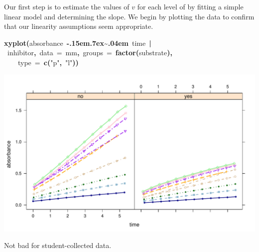 \documentclass{article}
\makeatletter
\newcommand{\hlfunctioncall}[1]{\textcolor[rgb]{0.501960784313725,0,0.329411764705882}{\textbf{#1}}}%
\newcommand{\hlstring}[1]{\textcolor[rgb]{0.6,0.6,1}{#1}}%
\newcommand{\hlkeyword}[1]{\textcolor[rgb]{0,0,0}{\textbf{#1}}}%
\newcommand{\hlargument}[1]{\textcolor[rgb]{0.690196078431373,0.250980392156863,0.0196078431372549}{#1}}%
\newcommand{\hlsymbol}[1]{\textcolor[rgb]{0,0,0}{#1}}%
\def\urltilda{\kern -.15em\lower .7ex\hbox{\~{}}\kern .04em}%
\newcommand{\hlstd}[1]{\textcolor[rgb]{0,0,0}{#1}}%
\newenvironment{kframe}{%
 \def\FrameCommand##1{\hskip\@totalleftmargin \hskip-\fboxsep
 \colorbox{shadecolor}{##1}\hskip-\fboxsep
     \hskip-\linewidth \hskip-\@totalleftmargin \hskip\columnwidth}%
 \MakeFramed {\advance\hsize-\width
   \@totalleftmargin\z@ \linewidth\hsize
   \@setminipage}}%
 {\par\unskip\endMakeFramed}
\newenvironment{knitrout}{}{} %
\makeatother
\begin{document}
Our first step is to estimate the values of $v$ for each level of 
by fitting a simple linear model and determining the slope.
We begin by plotting the data to confirm that our linearity assumptions seem
appropriate.
\begin{knitrout}
\color{fgcolor}\begin{kframe}
\begin{flushleft}
\ttfamily\noindent
\hlfunctioncall{xyplot}\hlkeyword{(}\hlsymbol{absorbance}{\ }\hlkeyword{\urltilda{}}{\ }\hlsymbol{time}{\ }\hlkeyword{|}{\ }\hlsymbol{inhibitor}\hlkeyword{,}{\ }\hlargument{data}{\ }\hlargument{=}{\ }\hlsymbol{mm}\hlkeyword{,}{\ }\hlargument{groups}{\ }\hlargument{=}{\ }\hlfunctioncall{factor}\hlkeyword{(}\hlsymbol{substrate}\hlkeyword{)}\hlkeyword{,}\hspace*{\fill}\\
\hlstd{}{\ }{\ }{\ }{\ }\hlargument{type}{\ }\hlargument{=}{\ }\hlfunctioncall{c}\hlkeyword{(}\hlstring{"{}p"{}}\hlkeyword{,}{\ }\hlstring{"{}l"{}}\hlkeyword{)}\hlkeyword{)}\mbox{}
\normalfont
\end{flushleft}
\end{kframe}

{\centering \includegraphics[width=.75\textwidth]{figures/modeling-unnamed-chunk-2} 

}


\end{knitrout}

\noindent
Not bad for student-collected data.
\end{document}
